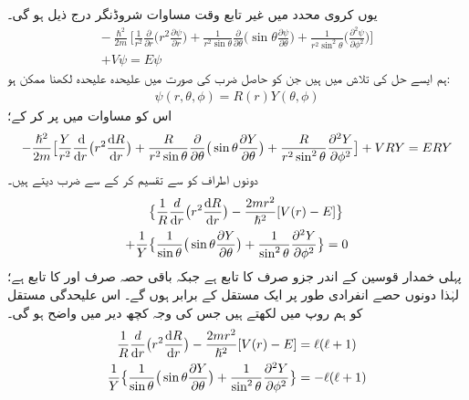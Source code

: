 یوں کروی محدد میں غیر تابع وقت مساوات شروڈنگر درج ذیل ہو گی۔ 
\begin{multline}\label{مساوات_ابعادی_لاپلاسی_ب}
-\frac{\hslash^{2}}{2m}\big [\frac{1}{r^{2}}\frac{\partial}{\partial{r}}\big (r^{2}\frac{\partial\psi}{\partial{r}}\big )+\frac{1}{r^{2}\sin{\theta}}\frac{\partial}{\partial{\theta}}\big(\sin{\theta}\frac{\partial\psi}{\partial{\theta}}\big )+\frac{1}{r^{2}\sin^{2}{\theta}}\big(\frac{\partial^{2}\psi}{\partial{\phi^{2}}}\big )\big ]\\
+V\psi=E\psi 
\end{multline}
ہم ایسے حل کی تلاش میں ہیں جن کو حاصل ضرب کی صورت میں علیحدہ علیحدہ لکھنا ممکن ہو:
\begin{align}
\psi(r,\theta,\phi)=R(r)Y(\theta,\phi) 
\end{align}
اس کو مساوات  میں پر کر کے؛
\begin{multline*}
-\frac{\hslash^{2}}{2m}\big [\frac{Y}{r^{2}}\frac{\dif}{\dif{r}}\big (r^{2}\frac{\dif{R}}{\dif{r}}\big )+\frac{R}{r^{2}\sin{\theta}}\frac{\partial}{\partial{\theta}}\big(\sin{\theta}\frac{\partial{Y}}{\partial{\theta}}\big )+\frac{R}{r^{2}\sin^{2}{\theta}}\frac{\partial^{2}{Y}}{\partial{\phi^{2}}}\big ]+VRY=ERY 
\end{multline*}
دونوں اطراف کو  سے تقسیم کر کے   سے ضرب دیتے ہیں۔
\begin{align*}
&\big\{\frac{1}{R}\frac{d}{\dif{r}}\big(r^{2}\frac{\dif{R}}{\dif{r}}\big)-\frac{2mr^{2}}{\hslash^{2}}[V(r)-E]\big\} \\
+\frac{1}{Y}&\big\{\frac{1}{\sin{\theta}}\big(\sin{\theta}\frac{\partial{Y}}{\partial{\theta}}\big)+\frac{1}{\sin^{2}{\theta}}\frac{\partial^{2}{Y}}{\partial{\phi^{2}}}\big\}=0 
\end{align*}
پہلی خمدار قوسین کے اندر جزو صرف  کا تابع ہے جبکہ باقی حصہ صرف     اور      کا تابع ہے؛  لہٰذا دونوں حصے انفرادی طور پر ایک مستقل کے برابر ہوں گے۔ اس علیحدگی مستقل کو ہم   روپ میں لکھتے ہیں جس کی وجہ کچھ دیر میں واضح ہو گی۔
\begin{align}
\frac{1}{R}\frac{d}{\dif{r}}\big(r^{2}\frac{\dif{R}}{\dif{r}}\big)-\frac{2mr^{2}}{\hslash^{2}}[V(r)-E]&=\ell(\ell+1)\label{مساوات_ابعاد_رداسی_الف} \\ 
\frac{1}{Y}\big\{\frac{1}{\sin{\theta}}\big(\sin{\theta}\frac{\partial{Y}}{\partial{\theta}}\big)+\frac{1}{\sin^{2}{\theta}}\frac{\partial^{2}{Y}}{\partial{\phi^{2}}}\big\}&=-\ell(\ell+1) \label{مساوات_ابعاد_غیر_رداسی_الف}
\end{align}
